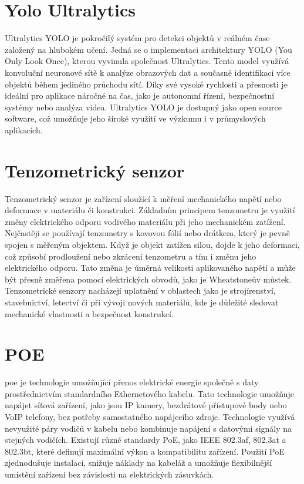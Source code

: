 \section{Yolo Ultralytics}\label{sec:yolo-ultralytics}
Ultralytics YOLO je pokročilý systém pro detekci objektů v reálném čase založený na hlubokém učení.
Jedná se o implementaci architektury YOLO (You Only Look Once), kterou vyvinula společnost Ultralytics.
Tento model využívá konvoluční neuronové sítě k analýze obrazových dat a současné identifikaci více objektů během jediného průchodu sítí.
Díky své vysoké rychlosti a přesnosti je ideální pro aplikace náročné na čas, jako je autonomní řízení, bezpečnostní systémy nebo analýza videa.
Ultralytics YOLO je dostupný jako open source software, což umožňuje jeho široké využití ve výzkumu i v průmyslových aplikacích.

\section{Tenzometrický senzor}\label{sec:tenzor}
Tenzometrický senzor je zařízení sloužící k měření mechanického napětí nebo deformace v materiálu či konstrukci.
Základním principem tenzometru je využití změny elektrického odporu vodivého materiálu při jeho mechanickém zatížení.
Nejčastěji se používají tenzometry s kovovou fólií nebo drátkem, který je pevně spojen s měřeným objektem.
Když je objekt zatížen silou, dojde k jeho deformaci, což způsobí prodloužení nebo zkrácení tenzometru a tím i změnu jeho elektrického odporu.
Tato změna je úměrná velikosti aplikovaného napětí a může být přesně změřena pomocí elektrických obvodů, jako je Wheatstoneův můstek.
Tenzometrické senzory nacházejí uplatnění v oblastech jako je strojírenství, stavebnictví, letectví či při vývoji nových materiálů, kde je důležité sledovat mechanické vlastnosti a bezpečnost konstrukcí.

\section{POE}\label{sec:poe}
\gls{poe} je technologie umožňující přenos elektrické energie společně s daty prostřednictvím standardního Ethernetového kabelu.
Tato technologie umožňuje napájet síťová zařízení, jako jsou IP kamery, bezdrátové přístupové body nebo VoIP telefony, bez potřeby samostatného napájecího zdroje.
Technologie využívá nevyužité páry vodičů v kabelu nebo kombinuje napájení s datovými signály na stejných vodičích.
Existují různé standardy PoE, jako IEEE 802.3af, 802.3at a 802.3bt, které definují maximální výkon a kompatibilitu zařízení.
Použití PoE zjednodušuje instalaci, snižuje náklady na kabeláž a umožňuje flexibilnější umístění zařízení bez závislosti na elektrických zásuvkách.


